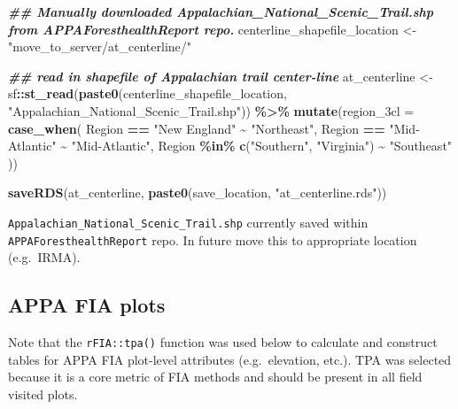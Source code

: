 \documentclass[
]{book}
\newenvironment{Shaded}{\begin{snugshade}}{\end{snugshade}}
\newcommand{\AttributeTok}[1]{\textcolor[rgb]{0.13,0.29,0.53}{#1}}
\newcommand{\DocumentationTok}[1]{\textcolor[rgb]{0.56,0.35,0.01}{\textbf{\textit{#1}}}}
\newcommand{\FunctionTok}[1]{\textcolor[rgb]{0.13,0.29,0.53}{\textbf{#1}}}
\newcommand{\NormalTok}[1]{#1}
\newcommand{\OtherTok}[1]{\textcolor[rgb]{0.56,0.35,0.01}{#1}}
\newcommand{\SpecialCharTok}[1]{\textcolor[rgb]{0.81,0.36,0.00}{\textbf{#1}}}
\newcommand{\StringTok}[1]{\textcolor[rgb]{0.31,0.60,0.02}{#1}}
\begin{document}
\begin{Shaded}
\begin{Highlighting}[]
\DocumentationTok{\#\# Manually downloaded \textasciigrave{}Appalachian\_National\_Scenic\_Trail.shp\textasciigrave{} from \textasciigrave{}APPAForesthealthReport\textasciigrave{} repo. }
\NormalTok{centerline\_shapefile\_location }\OtherTok{\textless{}{-}} \StringTok{"move\_to\_server/at\_centerline/"} 

\DocumentationTok{\#\# read in shapefile of Appalachian trail center{-}line}
\NormalTok{ at\_centerline }\OtherTok{\textless{}{-}}\NormalTok{ sf}\SpecialCharTok{::}\FunctionTok{st\_read}\NormalTok{(}\FunctionTok{paste0}\NormalTok{(centerline\_shapefile\_location, }\StringTok{"Appalachian\_National\_Scenic\_Trail.shp"}\NormalTok{)) }\SpecialCharTok{\%\textgreater{}\%}
   \FunctionTok{mutate}\NormalTok{(}\AttributeTok{region\_3cl =} \FunctionTok{case\_when}\NormalTok{(}
\NormalTok{     Region }\SpecialCharTok{==} \StringTok{"New England"} \SpecialCharTok{\textasciitilde{}} \StringTok{"Northeast"}\NormalTok{,}
\NormalTok{     Region }\SpecialCharTok{==} \StringTok{"Mid{-}Atlantic"} \SpecialCharTok{\textasciitilde{}} \StringTok{"Mid{-}Atlantic"}\NormalTok{,}
\NormalTok{     Region }\SpecialCharTok{\%in\%} \FunctionTok{c}\NormalTok{(}\StringTok{"Southern"}\NormalTok{, }\StringTok{"Virginia"}\NormalTok{) }\SpecialCharTok{\textasciitilde{}} \StringTok{"Southeast"}
\NormalTok{   ))}

\FunctionTok{saveRDS}\NormalTok{(at\_centerline, }\FunctionTok{paste0}\NormalTok{(save\_location, }\StringTok{"at\_centerline.rds"}\NormalTok{))}
\end{Highlighting}
\end{Shaded}

\texttt{Appalachian\_National\_Scenic\_Trail.shp} currently saved within \texttt{APPAForesthealthReport} repo. In future move this to appropriate location (e.g.~IRMA).

\hypertarget{appa-fia-plots}{%
\subsection{APPA FIA plots}\label{appa-fia-plots}}

Note that the \texttt{rFIA::tpa()} function was used below to calculate and construct tables for APPA FIA plot-level attributes (e.g.~elevation, etc.). TPA was selected because it is a core metric of FIA methods and should be present in all field visited plots.
\end{document}

